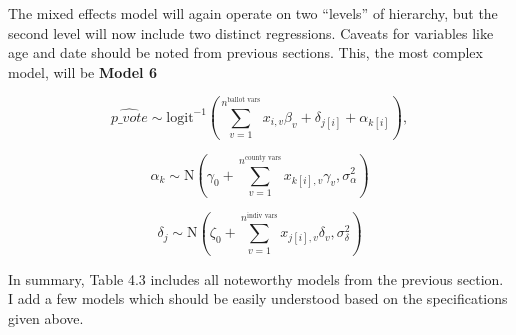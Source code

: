 \documentclass[]{article}
\begin{document}
The mixed effects model will again operate on two ``levels'' of
hierarchy, but the second level will now include two distinct
regressions. Caveats for variables like age and date should be noted
from previous sections. This, the most complex model, will be
\textbf{Model 6}

\begin{equation} \tag{Model 6}
\hat{p\_vote} \sim \text{logit}^{-1}(\sum_{v = 1}^{n^{\text{ballot vars}}}x_{i,v}\beta_{v} +\delta_{j[i]} + \alpha_{k[i]}),
\end{equation}

\[\alpha_{k} \sim \text{N}(\gamma_0 + \sum_{v=1}^{n^{\text{county vars}}}x_{k[i], v}\gamma_{v}, \sigma_{\alpha}^2)\]

\[\delta_{j} \sim \text{N}(\zeta_0 + \sum_{v=1}^{n^{\text{indiv vars}}}x_{j[i], v}\delta_{v}, \sigma_{\delta}^2)\]

In summary, Table 4.3 includes all noteworthy models from the previous
section. I add a few models which should be easily understood based on
the specifications given above.
\end{document}
